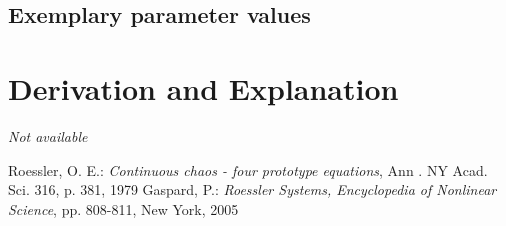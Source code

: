 \documentclass[10pt,a4paper]{article}
\begin{document}
	
	\subsection{Exemplary parameter values}
	

	
	\section{Derivation and Explanation} %
	
	\textit{Not available}
	
	
	\begin{thebibliography}{10}		
		Roessler, O. E.: 
		\textit{Continuous chaos - four prototype equations}, Ann . NY Acad. Sci. 316, p. 381, 1979
		Gaspard, P.: 
		\textit{Roessler Systems, Encyclopedia of Nonlinear Science}, pp. 808-811, New York, 2005
	\end{thebibliography}
\end{document}
